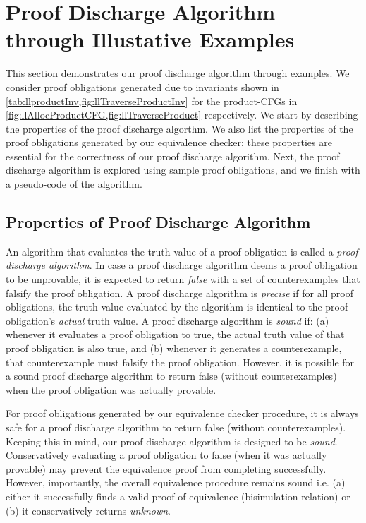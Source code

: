 \section[Proof Discharge Algorithm]{Proof Discharge Algorithm through Illustative Examples}
\label{sec:examples}
This section demonstrates our proof discharge algorithm through examples.
We consider proof obligations generated due to invariants shown in \cref{tab:llproductInv,fig:llTraverseProductInv}
for the product-CFGs in \cref{fig:llAllocProductCFG,fig:llTraverseProduct} respectively.
We start by describing the properties of the proof discharge algorthm.
We also list the properties of the proof obligations generated by our equivalence checker;
these properties are essential for the correctness of our proof discharge algorithm.
Next, the proof discharge algorithm is explored using sample proof obligations,
and we finish with a pseudo-code of the algorithm.

\subsection{Properties of Proof Discharge Algorithm}
\label{sec:proofalgoprops}
An algorithm that evaluates the truth value of a proof obligation is called a
{\em proof discharge algorithm}.
In case a proof discharge algorithm deems a proof obligation to be unprovable,
it is expected to return {\em false} with a set of counterexamples that falsify
the proof obligation.
A proof discharge algorithm is {\em precise} if for all proof obligations,
the truth value evaluated by the algorithm is identical to the proof obligation's
{\em actual} truth value.
A proof discharge algorithm is {\em sound} if:
(a) whenever it evaluates a proof obligation to true,
the actual truth value of that proof obligation is also true,
and (b) whenever it generates a counterexample, that counterexample
must falsify the proof obligation.
However, it is possible for a sound proof discharge algorithm to return false
(without counterexamples) when the proof obligation was actually provable.

For proof obligations generated by our equivalence checker procedure,
it is always safe for a proof discharge algorithm to return false (without counterexamples).
Keeping this in mind, our proof discharge algorithm is designed to be {\em sound}.
Conservatively evaluating a proof obligation to false (when it was actually provable)
may prevent the equivalence proof from completing successfully.
However, importantly, the overall equivalence procedure remains sound i.e.
(a) either it successfully finds a valid proof of equivalence (bisimulation relation)
or (b) it conservatively returns {\em unknown}.

